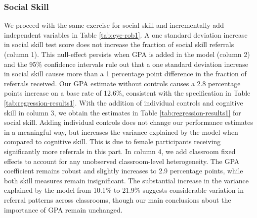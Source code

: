 \documentclass[11pt,a4paper,oneside]{article}
\begin{document}
\subsubsection*{Social Skill}
We proceed with the same exercise for social skill and incrementally add independent variables in Table \ref{tab:eye-rob1}. A one standard deviation increase in social skill test score does not increase the fraction of social skill referrals (column 1). This null-effect persists when GPA is added in the model (column 2) and the 95\% confidence intervals rule out that a one standard deviation increase in social skill causes more than a 1 percentage point difference in the fraction of referrals received. Our GPA estimate without controls causes a 2.8 percentage points increase on a base rate of 12.6\%, consistent with the specification in Table \ref{tab:regression-results1}. With the addition of individual controls and cognitive skill in column 3, we obtain the estimates in Table \ref{tab:regression-results1} for social skill. Adding individual controls does not change our performance estimates in a meaningful way, but increases the variance explained by the model when compared to cognitive skill. This is due to female participants receiving significantly more referrals in this part. In column 4, we add classroom fixed effects to account for any unobserved classroom-level heterogeneity. The GPA coefficient remains robust and slightly increases to 2.9 percentage points, while both skill measures remain insignificant. The substantial increase in the variance explained by the model from 10.1\% to 21.9\% suggests considerable variation in referral patterns across classrooms, though our main conclusions about the importance of GPA remain unchanged.   
\end{document}
